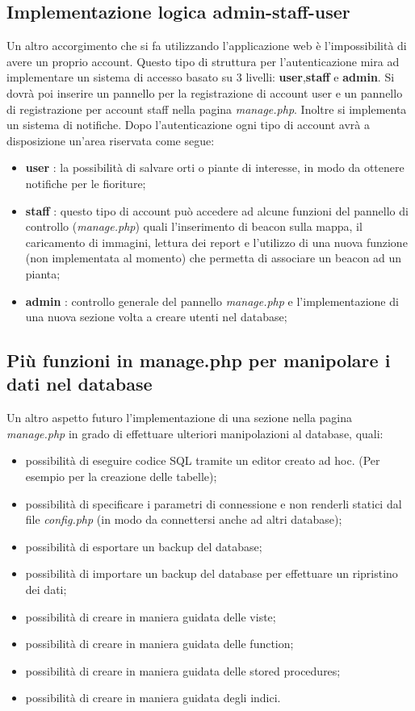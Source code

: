 \subsection{Implementazione logica admin-staff-user}
Un altro accorgimento che si fa utilizzando l'applicazione web è l'impossibilità di avere un proprio account. 
Questo tipo di struttura per l'autenticazione mira ad implementare un sistema di accesso basato su 3 livelli: \textbf{user},\textbf{staff} e \textbf{admin}.
Si dovrà poi inserire un pannello per la registrazione di account user e un pannello di registrazione per account staff nella pagina \textit{manage.php}. Inoltre si implementa un sistema di notifiche. \newline
Dopo l'autenticazione ogni tipo di account avrà a disposizione un'area riservata come segue:
\begin{itemize}
\item \textbf{user} : la possibilità di salvare orti o piante di interesse, in modo da ottenere notifiche per le fioriture;
\item \textbf{staff} : questo tipo di account può accedere ad alcune funzioni del pannello di controllo (\textit{manage.php}) quali l'inserimento di beacon sulla mappa, il caricamento di immagini, lettura dei report e l'utilizzo di una nuova funzione (non implementata al momento) che permetta di associare un beacon ad un pianta;
\item \textbf{admin} : controllo generale del pannello \textit{manage.php} e l'implementazione di una nuova sezione volta a creare utenti nel database;
\end{itemize}
\subsection{Più funzioni in manage.php per manipolare i dati nel database}
Un altro aspetto futuro l'implementazione di una sezione nella pagina \textit{manage.php} in grado di effettuare ulteriori manipolazioni al database, quali:
\begin{itemize}
\item possibilità di eseguire codice SQL tramite un editor creato ad hoc. (Per esempio per la creazione delle tabelle);
\item possibilità di specificare i parametri di connessione e non renderli statici dal file \textit{config.php} (in modo da connettersi anche ad altri database);
\item possibilità di esportare un backup del database;
\item possibilità di importare un backup del database per effettuare un ripristino dei dati;
\item possibilità di creare in maniera guidata delle viste;
\item possibilità di creare in maniera guidata delle function;
\item possibilità di creare in maniera guidata delle stored procedures;
\item possibilità di creare in maniera guidata degli indici.
\end{itemize}
